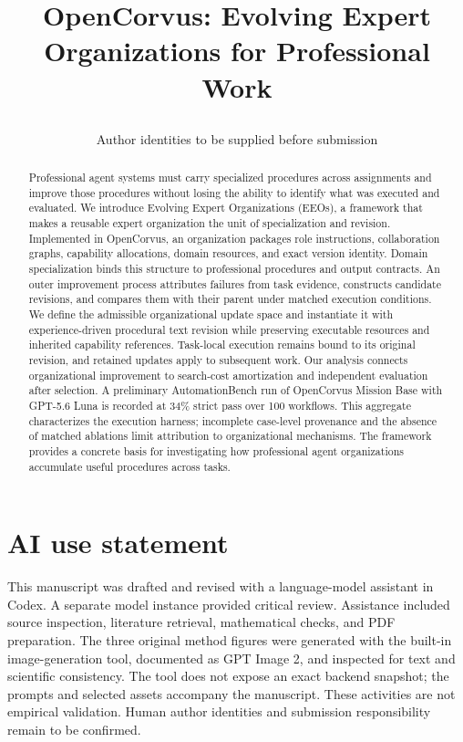 \documentclass{article}
\title{\raggedright OpenCorvus: Evolving Expert Organizations for Professional Work}
\author{Author identities to be supplied before submission}
\begin{document}
\maketitle
{}
\begin{abstract}
Professional agent systems must carry specialized procedures across assignments and improve those procedures without losing the ability to identify what was executed and evaluated. We introduce Evolving Expert Organizations (EEOs), a framework that makes a reusable expert organization the unit of specialization and revision. Implemented in OpenCorvus, an organization packages role instructions, collaboration graphs, capability allocations, domain resources, and exact version identity. Domain specialization binds this structure to professional procedures and output contracts. An outer improvement process attributes failures from task evidence, constructs candidate revisions, and compares them with their parent under matched execution conditions. We define the admissible organizational update space and instantiate it with experience-driven procedural text revision while preserving executable resources and inherited capability references. Task-local execution remains bound to its original revision, and retained updates apply to subsequent work. Our analysis connects organizational improvement to search-cost amortization and independent evaluation after selection. A preliminary AutomationBench run of OpenCorvus Mission Base with GPT-5.6 Luna is recorded at 34\% strict pass over 100 workflows. This aggregate characterizes the execution harness; incomplete case-level provenance and the absence of matched ablations limit attribution to organizational mechanisms. The framework provides a concrete basis for investigating how professional agent organizations accumulate useful procedures across tasks.
\end{abstract}






\section*{AI use statement}
This manuscript was drafted and revised with a language-model assistant in Codex. A separate model instance provided critical review. Assistance included source inspection, literature retrieval, mathematical checks, and PDF preparation. The three original method figures were generated with the built-in image-generation tool, documented as GPT Image 2, and inspected for text and scientific consistency. The tool does not expose an exact backend snapshot; the prompts and selected assets accompany the manuscript. These activities are not empirical validation. Human author identities and submission responsibility remain to be confirmed.

\begingroup\raggedright

\endgroup
\appendix
\clearpage

\end{document}
